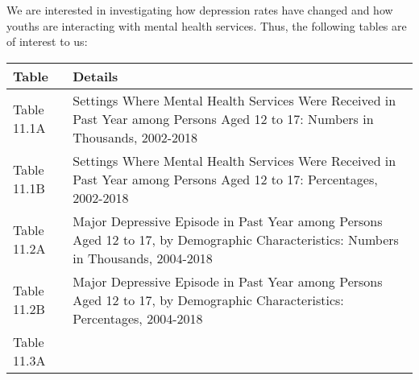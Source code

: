 \documentclass[
]{article}
\begin{document}
We are interested in investigating how depression rates have changed and
how youths are interacting with mental health services. Thus, the
following tables are of interest to us:

\begin{longtable}[]{@{}ll@{}}
\toprule
\begin{minipage}[b]{0.18\columnwidth}\raggedright
Table\strut
\end{minipage} & \begin{minipage}[b]{0.76\columnwidth}\raggedright
Details\strut
\end{minipage}\tabularnewline
\midrule
\endhead
\begin{minipage}[t]{0.18\columnwidth}\raggedright
Table 11.1A\strut
\end{minipage} & \begin{minipage}[t]{0.76\columnwidth}\raggedright
Settings Where Mental Health Services Were Received in Past Year among
Persons Aged 12 to 17: Numbers in Thousands, 2002-2018\strut
\end{minipage}\tabularnewline
\begin{minipage}[t]{0.18\columnwidth}\raggedright
Table 11.1B\strut
\end{minipage} & \begin{minipage}[t]{0.76\columnwidth}\raggedright
Settings Where Mental Health Services Were Received in Past Year among
Persons Aged 12 to 17: Percentages, 2002-2018\strut
\end{minipage}\tabularnewline
\begin{minipage}[t]{0.18\columnwidth}\raggedright
Table 11.2A\strut
\end{minipage} & \begin{minipage}[t]{0.76\columnwidth}\raggedright
Major Depressive Episode in Past Year among Persons Aged 12 to 17, by
Demographic Characteristics: Numbers in Thousands, 2004-2018\strut
\end{minipage}\tabularnewline
\begin{minipage}[t]{0.18\columnwidth}\raggedright
Table 11.2B\strut
\end{minipage} & \begin{minipage}[t]{0.76\columnwidth}\raggedright
Major Depressive Episode in Past Year among Persons Aged 12 to 17, by
Demographic Characteristics: Percentages, 2004-2018\strut
\end{minipage}\tabularnewline
\begin{minipage}[t]{0.18\columnwidth}\raggedright
Table 11.3A\strut
\end{minipage} & \begin{minipage}[t]{0.76\columnwidth}\raggedright

\end{minipage}
\end{longtable}
\end{document}
